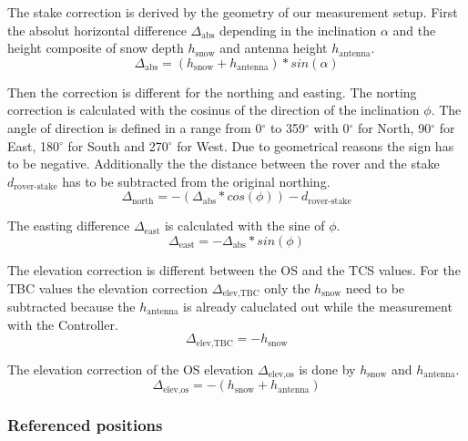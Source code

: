 The stake correction is derived by the geometry of our measurement setup.
First the absolut horizontal difference $\Delta_{\text{abs}}$ depending in the inclination $\alpha$ and the height composite of snow depth $h_{\text{snow}}$ and antenna height $h_{\text{antenna}}$.
\begin{equation}
	\Delta_{\text{abs}} = (h_{\text{snow}} + h_{\text{antenna}}) * sin(\alpha)
\end{equation}

Then the correction is different for the northing and easting. The norting correction is calculated with the cosinus of the direction of the inclination $\phi$. 
The angle of direction is defined in a range from 0$^{\circ}$ to 359$^{\circ}$ with 0$^{\circ}$ for North, 90$^{\circ}$ for East, 180$^{\circ}$ for South and 270$^{\circ}$ for West.
Due to geometrical reasons the sign has to be negative. 
Additionally the the distance between the rover and the stake $d_{\text{rover-stake}}$ has to be subtracted from the original northing.
\begin{equation}
	\Delta_{\text{north}} = - (\Delta_{\text{abs}} * cos(\phi)) - d_{\text{rover-stake}}
\end{equation}

The easting difference $\Delta_{\text{east}}$ is calculated with the sine of $\phi$.
\begin{equation}
	\Delta_{\text{east}} = - \Delta_{\text{abs}} * sin(\phi)
\end{equation}

The elevation correction is different between the OS and the TCS values.
For the TBC values the elevation correction $\Delta_{\text{elev,TBC}}$ only the $h_{\text{snow}}$ need to be subtracted because the $h_{\text{antenna}}$ is already caluclated out while the measurement with the Controller.
\begin{equation}
	\Delta_{\text{elev,TBC}} = - h_{\text{snow}} 
\end{equation}

The elevation correction of the OS elevation $\Delta_{\text{elev,os}}$ is done by $h_{\text{snow}}$ and $h_{\text{antenna}}$.
\begin{equation}
	\Delta_{\text{elev,os}} = - (h_{\text{snow}} + h_{\text{antenna}}) 
\end{equation}

\subsubsection*{Referenced positions}

